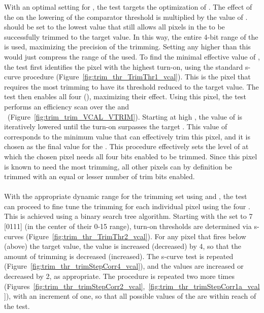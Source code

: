 With an optimal setting for \vthrcomp, the test targets the optimization of \vtrim.
The effect of the \trimbits on the lowering of the comparator threshold is multiplied by the value of \vtrim.
\vtrim should be set to the lowest value that still allows all pixels in the \roc to be successfully trimmed to the target value.
In this way, the entire 4-bit range of the \trimbits is used, maximizing the precision of the trimming.
Setting \vtrim any higher than this would just compress the range of the \trimbits used.
To find the minimal effective value of \vtrim, the test first identifies the pixel with the highest \vcal turn-on, 
using the standard s-curve procedure (Figure~\ref{fig:trim_thr_TrimThr1_vcal}).
This is the pixel that requires the most trimming to have its \vcal threshold reduced to the target value.
The test then enables all four \trimbits (), maximizing their effect.
Using this pixel, the test performs an efficiency scan over the \vtrim and \vcal~\dacs (Figure~\ref{fig:trim_trim_VCAL_VTRIM}).
Starting at high \vtrim, the value of \vtrim is iteratively lowered until the \vcal turn-on surpasses the target \vcal.
This value of \vtrim corresponds to the minimum value that can effectively trim this pixel, 
and it is chosen as the final \vtrim value for the \roc.
This procedure effectively sets the level of \vtrim at which the chosen pixel needs all four bits enabled to be trimmed.
Since this pixel is known to need the most trimming, 
all other pixels can by definition be trimmed with an equal or lesser number of trim bits enabled.
\\\\
With the appropriate dynamic range for the trimming set using \vthrcomp and \vtrim, 
the test can proceed to fine tune the trimming for each individual pixel using the four \trimbits.
This is achieved using a binary search tree algorithm.
Starting with the \trimbits set to 7 [0111] (in the center of their 0-15 range), 
\vcal turn-on thresholds are determined via s-curves (Figure~\ref{fig:trim_thr_TrimThr2_vcal}).
For any pixel that fires below (above) the target \vcal value, the \trimbits value is increased (decreased) by 4, 
so that the amount of trimming is decreased (increased).
The s-curve test is repeated (Figure~\ref{fig:trim_thr_trimStepCorr4_vcal}), and the \trimbits values are increased or decreased by 2, as appropriate.
The procedure is repeated two more times (Figures~\ref{fig:trim_thr_trimStepCorr2_vcal},~\ref{fig:trim_thr_trimStepCorr1a_vcal}), with an increment of one, 
so that all possible values of the \trimbits are within reach of the test.

